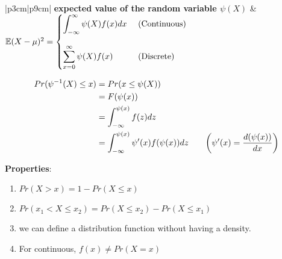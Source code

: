 \begin{customTableWrapper}{1.3}
\begin{longtable}{|p{3cm}|p{9cm}|}
    \textbf{expected value of the random variable $\psi(X)$} &
    \vspace{0.1cm} \(
        \mathbb{E}(X-\mu)^2 =
        \begin{dcases}
            \displaystyle\int_{-\infty}^\infty \psi(X) f(x)dx &
            \text{ (Continuous)}\\[2ex]
            \displaystyle\sum_{x=0}^\infty \psi(X) f(x) &
            \text{ (Discrete)}\\
        \end{dcases}
    \) \vspace{0.1cm} \\
    \hline

\end{longtable}
\end{customTableWrapper}

\[
\begin{aligned}
    Pr(\psi^{-1}(X) \leq x) 
    &= Pr(x\leq\psi(X)) \\
    &= F(\psi(x)) \\
    &= \displaystyle\int_{-\infty}^{\psi(x)} f(z)dz\\
    &= \displaystyle\int_{-\infty}^{\psi(x)} \psi'(x) f(\psi(x))dz &&& \left( \psi'(x) = \dfrac{d(\psi(x))}{dx} \right)\\
\end{aligned}
\]

\textbf{Properties}:
\begin{enumerate}
    \item $Pr(X > x) = 1 - Pr(X \leq x)$

    \item $Pr(x_1 < X \leq x_2) = Pr(X \leq x_2) - Pr(X \leq x_1)$

    \item we can define a distribution function without having a density. 

    \item For continuous, $f(x) \neq Pr(X = x)$

\end{enumerate}



































